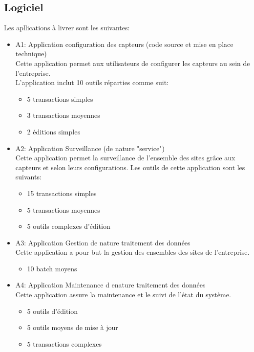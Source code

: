 \documentclass[a4paper]{article}
\begin{document}
	    \subsection{Logiciel}
	        Les apllications à livrer sont les suivantes:
	        \begin{itemize}
	        \item A1: Application configuration des capteurs (code source et mise en place technique) \\
	            Cette application permet aux utilisateurs de configurer les capteurs au sein de l’entreprise.\\
                L’application inclut 10 outils réparties comme suit:
                \begin{itemize}
                    \item 5 transactions simples
                    \item 3 transactions moyennes
                    \item 2 éditions simples
                \end{itemize}
	        \item A2: Application Surveillance (de nature "service") \\
	        Cette application permet la surveillance de l’ensemble des sites grâce aux capteurs et selon leurs configurations. Les outils de cette application sont les suivants:
	        \begin{itemize}
	            \item 15 transactions simples
	            \item 5 transactions moyennes
	            \item 5 outils complexes d’édition
	        \end{itemize}
	        \item A3: Application Gestion de nature traitement des données \\
	        Cette application a pour but la gestion des ensembles des sites de l’entreprise. 
            \begin{itemize}
                \item 10 batch moyens
            \end{itemize}
	        \item A4: Application Maintenance d enature traitement des données\\
	        Cette application assure la maintenance et le suivi de l'état du système.
	        \begin{itemize}
	            \item 5 outils d'édition
	            \item 5 outils moyens de mise à jour
	            \item 5 transactions complexes
	        \end{itemize}
        \end{itemize}
	    \newpage
	    
\end{document}
